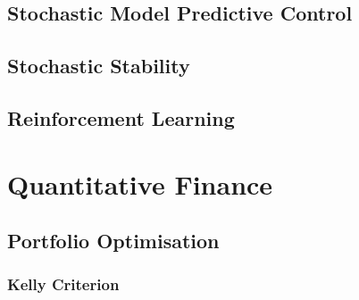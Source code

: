 \documentclass[11pt]{report} %
\begin{document}
\section{Stochastic Model Predictive Control}

\section{Stochastic Stability}

\section{Reinforcement Learning}

\chapter{Quantitative Finance}

\section{Portfolio Optimisation}

\subsection{Kelly Criterion}
\end{document}
